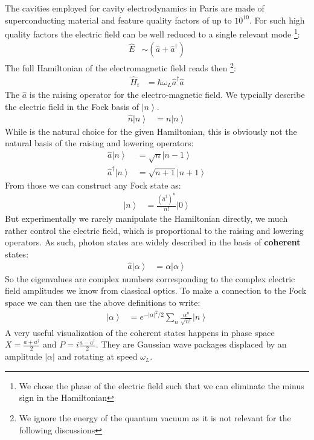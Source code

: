 \documentclass[10pt]{article}
\newcommand{\ket}[1]{\ensuremath{\left|#1\right\rangle}}
\begin{document}
The cavities employed for cavity electrodynamics in Paris are made of superconducting material and feature quality factors of up to $10^{10}$. For such high quality factors the electric field can be well reduced to a single relevant mode \footnote{We chose the phase of the electric field such that we can eliminate the minus sign in the Hamiltonian}:
\begin{align}
\hat{E} &\sim (\hat{a} + \hat{a}^\dag)
\end{align}
The full Hamiltonian of the electromagnetic field reads then
\footnote{We ignore the energy of the quantum vacuum as it is not relevant for the following discussions}:
\begin{align}
\hat{H}_\textrm{f} &= \hbar\omega_L \hat{a}^\dag \hat{a}
\end{align}
The $\hat{a}$ is the raising operator for the electro-magnetic field. We typcially describe the electric field in the Fock basis of $\ket{n}$.
\begin{align}
\hat{n} \ket{n} &= n \ket{n}
\end{align}
While is the natural choice for the given Hamiltonian, this is obviously not the natural basis of the raising and lowering operators:
\begin{align}
\hat{a} \ket{n} &= \sqrt{n} \ket{n-1}\\
\hat{a}^\dag \ket{n} &= \sqrt{n+1} \ket{n+1}
\end{align}
From those we can construct any Fock state as:
\begin{align}
\ket{n} &= \frac{\left(\hat{a}^\dag\right)^n}{n!}\ket{0}
\end{align}
But experimentally we rarely manipulate the Hamiltonian directly, we much rather control the electric field, which is proportional to the raising and lowering operators. As such, photon states are widely described in the basis of \textbf{coherent} states:
\begin{align}
\hat{a}\ket{\alpha}&= \alpha\ket{\alpha}
\end{align}
So the eigenvalues are complex numbers corresponding to the complex electric field amplitudes we know from classical optics. To make a connection to the Fock space we can then use the above definitions to write:
\begin{align}
\ket{\alpha} &=e^{-|\alpha|^2/2}\sum_n \frac{\alpha^n}{\sqrt{n!}}\ket{n}
\end{align}
A very useful visualization of the coherent states happens in phase space $X = \frac{a+a^\dag}{2}$ and $P = i\frac{a-a^\dag}{2}$. They are Gaussian wave packages displaced by an amplitude $|\alpha|$ and rotating at speed $\omega_L$. 
\end{document}
